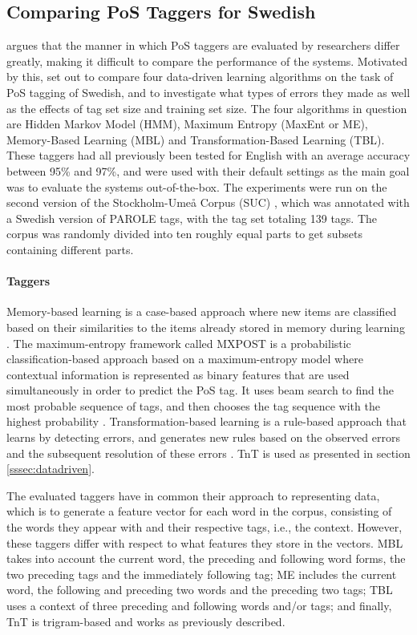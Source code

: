 \documentclass[a4paper,12pt,english]{book}
\begin{document}
\subsection{Comparing PoS Taggers for Swedish}
 argues that the manner in which PoS taggers are evaluated by
researchers differ greatly, making it difficult to compare the performance of
the systems. Motivated by this, \citeauthor{Meg:01} set out to compare four
data-driven learning algorithms on the task of PoS tagging of
Swedish, and to investigate what types of errors they made as well as the
effects of tag set size and training set size. The four algorithms in question
are Hidden Markov Model (HMM), Maximum Entropy (MaxEnt or ME), Memory-Based
Learning (MBL) and Transformation-Based Learning (TBL). These taggers had all
previously been tested for English with an average accuracy between 95\% and
97\%, and were used with their default settings as the main goal was to
evaluate the systems out-of-the-box. The experiments were run on the second
version of the Stockholm-Umeå Corpus (SUC) \cite{Gus:Har:06}, which was
annotated with a Swedish version of PAROLE tags, with the tag set totaling 139
tags. The corpus was randomly divided into ten roughly equal parts to get
subsets containing different parts.

\paragraph{Taggers}
Memory-based learning is a case-based approach where new items are classified
based on their similarities to the items already stored in memory during
learning \cite{Dae:Zav:Ber:96}. The maximum-entropy framework called MXPOST is
a probabilistic classification-based approach based on a maximum-entropy model
where contextual information is represented as binary features that are used
simultaneously in order to predict the PoS tag. It uses beam search to find the
most probable sequence of tags, and then chooses the tag sequence with the
highest probability \cite{Rat:96}. Transformation-based learning is a
rule-based approach that learns by detecting errors, and generates new rules
based on the observed errors and the subsequent resolution of these errors
\cite{Bri:94}. TnT is used as presented in section \ref{sssec:datadriven}.

The evaluated taggers have in common their approach to representing data, which
is to generate a feature vector for each word in the corpus, consisting of the
words they appear with and their respective tags, i.e., the context. However,
these taggers differ with respect to what features they store in the vectors.
MBL takes into account the current word, the preceding and following word
forms, the two preceding tags and the immediately following tag; ME includes
the current word, the following and preceding two words and the preceding two
tags; TBL uses a context of three preceding and following words and/or tags;
and finally, TnT is trigram-based and works as previously described.
\end{document}
